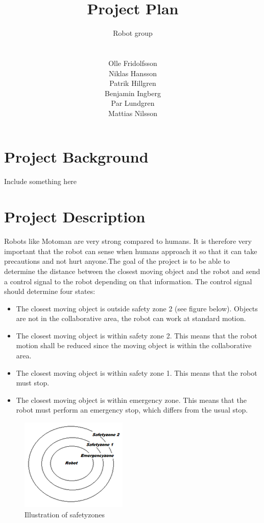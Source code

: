 \documentclass[10pt,a4paper]{article}
\title{Project Plan}
\author{\begin{large}{Robot group}\end{large}\\\\
Olle Fridolfsson\\  Niklas Hansson\\ Patrik Hillgren\\ Benjamin Ingberg\\ Par Lundgren\\ Mattias Nilsson}
\begin{document}
\maketitle
\newpage
\tableofcontents
\newpage
\noindent %
\section{Project Background}
Include something here
\section{Project Description}
Robots like Motoman are very strong compared to humans. It is therefore very important that the robot can sense when humans approach it so that it can take precautions and not hurt anyone.The goal of the project is to be able to determine the distance between the closest moving object and the robot and send a control signal to the robot depending on that information. The control signal should determine four states:

\begin{itemize}
  \item The closest moving object is outside safety zone 2 (see figure below). Objects are not in the collaborative area, the robot can work at standard motion.
  \item The closest moving object is within safety zone 2. This means that the robot motion shall be reduced since the moving object is within the collaborative area.
  \item The closest moving object is within safety zone 1. This means that the robot must stop.
  \item The closest moving object is within emergency zone. This means that the robot must perform an emergency stop, which differs from the usual stop.
\end{itemize}

\begin{figure}[H] 
  \centering
    \includegraphics{safetyzones.png}
    \caption{Illustration of safetyzones}
    \label{fig:safetyzone}
\end{figure}
\end{document}
